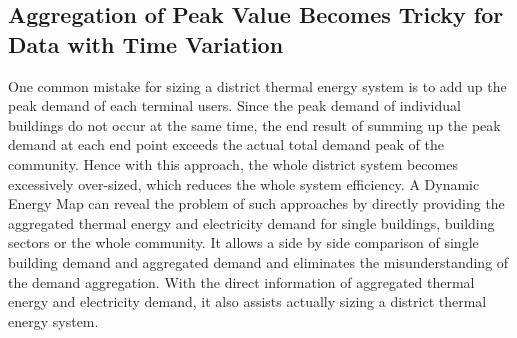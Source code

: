 \subsection{Aggregation of Peak Value Becomes Tricky for Data with
  Time Variation}
One common mistake for sizing a district thermal energy system is to
add up the peak demand of each terminal users. Since the peak demand
of individual buildings do not occur at the same time, the end result
of summing up the peak demand at each end point exceeds the actual
total demand peak of the community. Hence with this approach, the
whole district system becomes excessively over-sized, which reduces
the whole system efficiency. A Dynamic Energy Map can reveal the
problem of such approaches by directly providing the aggregated
thermal energy and electricity demand for single buildings, building
sectors or the whole community. It allows a side by side comparison of
single building demand and aggregated demand and eliminates the
misunderstanding of the demand aggregation. With the direct
information of aggregated thermal energy and electricity demand, it
also assists actually sizing a district thermal energy system.



